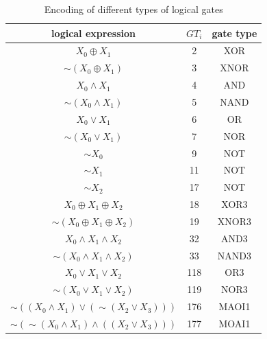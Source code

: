 \documentclass[final,5p,times,twocolumn]{elsarticle}
\begin{document}
\begin{table}[h]
    \caption{Encoding of different types of logical gates}\label{tab3}%
    \begin{tabular}{|c|c|c|}
        \hline
        logical expression                                   & $GT_i$ & gate type \\
        \hline
        $X_0 \oplus X_1$                                     & 2      & XOR       \\
        $\sim (X_0 \oplus X_1)$                              & 3      & XNOR      \\
        $X_0 \land X_1$                                      & 4      & AND       \\
        $\sim (X_0 \land X_1)$                               & 5      & NAND      \\
        $X_0 \lor X_1$                                       & 6      & OR        \\
        $\sim (X_0 \lor X_1)$                                & 7      & NOR       \\
        $\sim X_0$                                           & 9      & NOT       \\
        $\sim X_1$                                           & 11     & NOT       \\
        $\sim X_2$                                           & 17     & NOT       \\
        $X_0 \oplus X_1 \oplus X_2$                          & 18     & XOR3      \\
        $\sim (X_0 \oplus X_1 \oplus X_2)$                   & 19     & XNOR3     \\
        $X_0 \land X_1 \land X_2$                            & 32     & AND3      \\
        $\sim (X_0 \land X_1 \land X_2)$                     & 33     & NAND3     \\
        $X_0 \lor X_1 \lor X_2$                              & 118    & OR3       \\
        $\sim (X_0 \lor X_1 \lor X_2)$                       & 119    & NOR3      \\
        $\sim ((X_0 \land X_1) \lor (\sim (X_2 \lor X_3)))$  & 176    & MAOI1     \\
        $\sim (\sim (X_0 \land X_1) \land ((X_2 \lor X_3)))$ & 177    & MOAI1     \\
        \hline
    \end{tabular}
\end{table}
\end{document}
